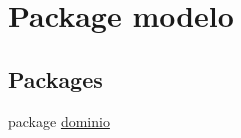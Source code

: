 \hypertarget{namespacemodelo}{}\section{Package modelo}
\label{namespacemodelo}
\subsection*{Packages}
\begin{DoxyCompactItemize}
\item 
package \mbox{\hyperlink{namespacemodelo_1_1dominio}{dominio}}
\end{DoxyCompactItemize}

